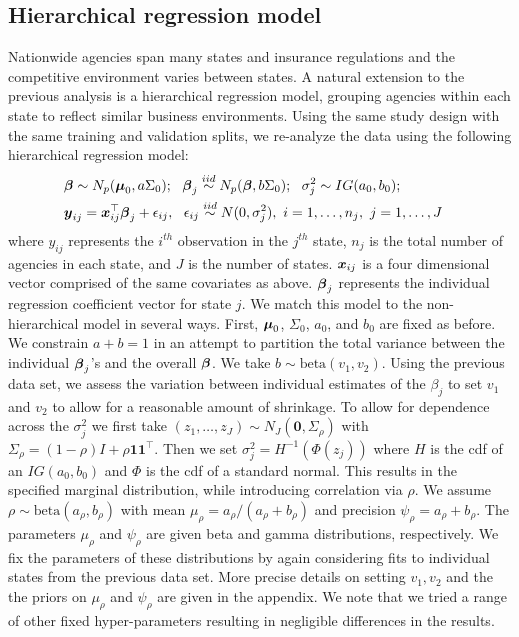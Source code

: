 \documentclass[12pt]{article}
\def\bbeta{\mbox{\boldmath $\beta$}}
\def\bmu{\mbox{\boldmath $\mu$}}
\newcommand{\bx}{\mbox{\boldmath $x$}}
\newcommand{\by}{\mbox{\boldmath $y$}}
\newcommand{\mb}{\mathbf}
\newcommand{\iid}{\stackrel{iid}{\sim}}
\begin{document}
 
\subsection{Hierarchical regression model}
\label{hierRegNW}
Nationwide agencies span many states and insurance regulations and the competitive environment varies between states. A natural extension to the previous analysis is a hierarchical regression model, grouping agencies within each state to reflect similar business environments. Using the same study design with the same training and validation splits, we re-analyze the data using the following hierarchical regression model:
\begin{align}
\label{eq:hierModel}
&\bbeta\sim N_p(\bmu_0, a\Sigma_0);\ \ 
\bbeta_j\iid N_p(\bbeta, b\Sigma_0); \ \  
\sigma_j^2\sim IG(a_0,b_0);  & \\ \nonumber
& \by_{ij}=\bx_{ij}^\top\bbeta_j+\epsilon_{ij},\ \ \epsilon_{ij}\iid N(0, \sigma_j^2),\ i=1,\dots, n_j,\ j=1,\dots, J &
\end{align}
where $y_{ij}$  represents the $i^{th}$ observation in the $j^{th}$
state, $n_j$ is the total number of agencies in each state, and $J$ is
the number of states. $\bx_{ij}$ is a four dimensional vector
comprised of the same covariates as above. $\bbeta_j$ represents the
individual regression coefficient vector for state $j$.  We match this
model to the non-hierarchical model in several ways. First, $\bmu_0$,
$\Sigma_0$, $a_0$, and $b_0$ are fixed as before. We constrain $a+b=1$
in an attempt to partition the total variance between the individual
$\bbeta_j$'s and the overall $\bbeta$. We take $b\sim
\text{beta}(v_1,v_2)$. Using the previous data set, we assess the
variation between individual estimates of the $\beta_j$ to set $v_1$
and $v_2$ to allow for a reasonable amount of shrinkage. To allow for
dependence across the $\sigma_j^2$ we first take
$(z_1,\dots,z_J)\sim N_J(\mathbf{0}, \Sigma_\rho)$ with
$\Sigma_\rho=(1-\rho)I+\rho \mb{1}\mb{1}^{\top}$. Then we set
$\sigma^2_j=H^{-1}(\Phi(z_j))$ where $H$ is the cdf of an
$IG(a_0,b_0)$ and $\Phi$ is the cdf of a standard normal. This results in the specified marginal distribution, while
introducing correlation via $\rho$. We assume $\rho\sim
\text{beta}(a_\rho,b_\rho)$ with mean $\mu_\rho=a_\rho/(a_\rho+b_\rho)$ and precision
$\psi_\rho=a_\rho+b_\rho$. The parameters $\mu_\rho$ and
$\psi_{\rho}$  are given beta and gamma distributions, respectively. We fix the parameters of these distributions by again considering fits to individual states from the previous data set. More precise details on setting $v_{1}, v_{2}$ and the the priors on $\mu_{\rho}$ and $\psi_{\rho}$ are given in the appendix. We note that we tried a range of other fixed hyper-parameters resulting in negligible differences in the results. 
\end{document}
